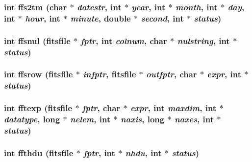 \subsubsection{\setlength{\rightskip}{0pt plus 5cm}int ffs2tm (char $\ast$ {\em datestr}, int $\ast$ {\em year}, int $\ast$ {\em month}, int $\ast$ {\em day}, int $\ast$ {\em hour}, int $\ast$ {\em minute}, double $\ast$ {\em second}, int $\ast$ {\em status})}\label{fitsio_8h_1f6250df0ad32ae2dedecc8e87c5a0c4}


\subsubsection{\setlength{\rightskip}{0pt plus 5cm}int ffsnul (\bf{fitsfile} $\ast$ {\em fptr}, int {\em colnum}, char $\ast$ {\em nulstring}, int $\ast$ {\em status})}\label{fitsio_8h_e37082cec0cc8a2faa07d2092b15028f}


\subsubsection{\setlength{\rightskip}{0pt plus 5cm}int ffsrow (\bf{fitsfile} $\ast$ {\em infptr}, \bf{fitsfile} $\ast$ {\em outfptr}, char $\ast$ {\em expr}, int $\ast$ {\em status})}\label{fitsio_8h_a51c12d3b8193a1f70ec5887735d715e}


\subsubsection{\setlength{\rightskip}{0pt plus 5cm}int fftexp (\bf{fitsfile} $\ast$ {\em fptr}, char $\ast$ {\em expr}, int {\em maxdim}, int $\ast$ {\em datatype}, long $\ast$ {\em nelem}, int $\ast$ {\em naxis}, long $\ast$ {\em naxes}, int $\ast$ {\em status})}\label{fitsio_8h_8464a713d9b0107bee75323d75ddc5a8}


\subsubsection{\setlength{\rightskip}{0pt plus 5cm}int ffthdu (\bf{fitsfile} $\ast$ {\em fptr}, int $\ast$ {\em nhdu}, int $\ast$ {\em status})}\label{fitsio_8h_da01e120ae03c69bd036e88ba6a1699c}


